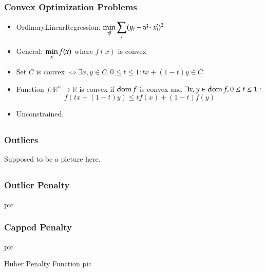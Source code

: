 \subsection{}
\begin{frame}
\frametitle{Convex Optimization Problems}
\begin{itemize}
\item OrdinaryLinearRegression: $\displaystyle \min_{\vec{w}}\sum_i(y_i -
  \vec{w} \cdot \vec{x_i})^2$
\item General: $\displaystyle \min_xf(x)$ where $f(x)$ is convex
\item Set $C$ is convex $\Longleftrightarrow \exists x, y\in C, 0\le t
  \le 1: tx +(1 - t)y \in C$
\item Function $f : \mathbb{R}^n \rightarrow \mathbb{R}$ is convex if
  $\operatorname{dom} f$ is convex and $\exists x, y \in \operatorname{dom} f, 0\le t \le 1:$
$$f(tx + (1 - t)y) \le tf(x) + (1 - t)f(y)$$
\end{itemize}

\begin{itemize}
\item Unconstrained.
\end{itemize}

\end{frame}

\subsection{}

\begin{frame}
  \frametitle{Outliers}

Supposed to be a picture here.
\end{frame}

\subsection{}
\begin{frame}
  \frametitle{Outlier Penalty}
pic
\end{frame}

\begin{frame}
  \frametitle{Capped Penalty}
pic
\end{frame}

\begin{frame}
Huber Penalty Function
pic
\end{frame}
